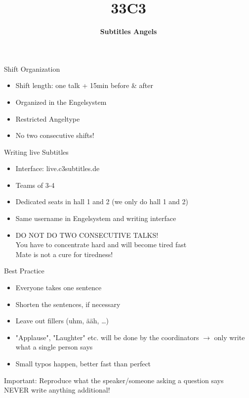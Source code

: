 \documentclass[utf8,widescreen]{beamer}
\title{\Huge \textbf{33C3}}
\subtitle{\Large \textbf{Subtitles Angels}}
\date{}
\begin{document}
\begin{frame}{\titlepage}
\end{frame}

\begin{frame}{Shift Organization}
\pause
\begin{block}{}
\begin{itemize}\itemsep 14pt
\item{Shift length: one talk + 15min before \& after}
\pause
\item{Organized in the Engelsystem}
\pause
\item{Restricted Angeltype}
\pause
\item{No two consecutive shifts!}
\end{itemize}
\end{block}
\end{frame}

\begin{frame}{Writing live Subtitles}
\pause
\begin{block}{}
\begin{itemize}\itemsep 10pt
\item{Interface: live.c3subtitles.de}
\pause
\item{Teams of 3-4}
\pause
\item{Dedicated seats in hall 1 and 2 (we only do hall 1 and 2)}
\pause
\item{Same username in Engelsystem and writing interface}
\pause
\item{\large DO NOT DO TWO CONSECUTIVE TALKS!\\
\normalsize You have to concentrate hard and will become tired fast\\
Mate is not a cure for tiredness!}
\end{itemize}
\end{block}
\end{frame}

\begin{frame}{Best Practice}
\pause
\begin{block}{}
\begin{itemize}\itemsep 10pt
\item{Everyone takes one sentence}
\pause
\item{Shorten the sentences, if necessary}
\pause
\item{Leave out fillers (uhm, ääh, \dots)}
\pause
\item{"Applause", "Laughter" etc. will be done by the coordinators $\rightarrow$ only write what a single person says}
\pause
\item{Small typos happen, better fast than perfect}
\end{itemize}
\pause
\end{block}
\begin{block}{Important:}
Reproduce what the speaker/someone asking a question says\\
NEVER write anything additional!
\end{block}
\end{frame}
\end{document}
